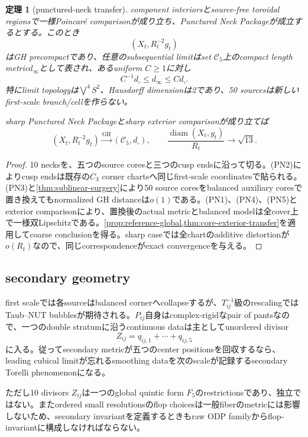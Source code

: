 \documentclass[11pt,a4paper]{ltjsarticle}
\newtheorem{theorem}{定理}[section]
\theoremstyle{definition}
\theoremstyle{remark}
\newcommand{\diam}{\operatorname{diam}}
\newcommand{\GH}{\mathrm{GH}}
\begin{document}
\begin{theorem}[punctured-neck transfer]\label{thm:PNP-transfer}
component interiorsとsource-free toroidal regionsで一様Poincaré comparisonが成り立ち、Punctured Neck Packageが成立するとする。このとき
\[
 (X_t,R_t^{-2}g_t)
\]
はGH precompactであり、任意のsubsequential limitはset $\mathcal C_5$上のcompact length metric$d_\infty$として表され、あるuniform $C\ge1$に対し
\[
 C^{-1}d_\square\le d_\infty\le Cd_\square.
\]
特にlimit topologyは$\bigvee^4S^2$、Hausdorff dimensionは2であり、50 sourcesは新しいfirst-scale branch/cellを作らない。

sharp Punctured Neck Packageとsharp exterior comparisonが成り立てば
\[
 (X_t,R_t^{-2}g_t)\xrightarrow{\GH}(\mathcal C_5,d_\square),
 \qquad
 \frac{\diam(X_t,g_t)}{R_t}\to\sqrt{13}.
\]
\end{theorem}

\begin{proof}
10 necksを、五つのsource coresと三つのcusp endsに沿って切る。(PN2)によりcusp endsは既存の$C_3$ corner chartsへ同じfirst-scale coordinatesで貼られる。(PN3)と\cref{thm:sublinear-surgery}により50 source coresをbalanced auxiliary coresで置き換えてもnormalized GH distanceは$o(1)$である。(PN1)、(PN4)、(PN5)とexterior comparisonにより、置換後のactual metricとbalanced modelは全cover上で一様双Lipschitzである。\cref{prop:reference-global,thm:core-exterior-transfer}を適用してcoarse conclusionを得る。sharp caseでは全chartのadditive distortionが$o(R_t)$なので、同じcorrespondenceがexact convergenceを与える。
\end{proof}

\subsection{secondary geometry}

first scaleでは各sourceはbalanced cornerへcollapseするが、$T_{ij}^{-1}$級のrescalingではTaub--NUT bubblesが期待される。$P_{ij}$自身はcomplex-rigidなpair of pantsなので、一つのdouble stratumに沿うcontinuous dataは主としてunordered divisor
\[
 Z_{ij}=q_{ij,1}+\cdots+q_{ij,5}
\]
に入る。従ってsecondary metricが五つのcenter positionsを回収するなら、leading cubical limitが忘れるsmoothing dataを次のscaleが記録するsecondary Torelli phenomenonになる。

ただし10 divisors $Z_{ij}$は一つのglobal quintic form $F_5$のrestrictionsであり、独立ではない。またordered small resolutionsのflop choicesは一般fiberのmetricには影響しないため、secondary invariantを定義するときもraw ODP familyからflop-invariantに構成しなければならない。
\end{document}
